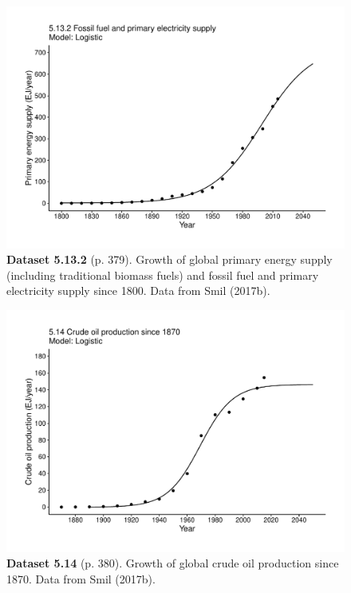 \documentclass[aps,rmp,preprint,superscriptaddress,10pt,onecolumn]{article}
\begin{document}
\clearpage
\begin{figure}[h]
\includegraphics[width=\textwidth]{output/figs-ggplot/5.13.2.pdf}
\caption*{\textbf{Dataset 5.13.2} (p. 379). Growth of global primary energy supply (including traditional biomass fuels) and fossil fuel and primary electricity supply since 1800. Data from Smil (2017b). }
\end{figure}
	
\clearpage
\begin{figure}[h]
\includegraphics[width=\textwidth]{output/figs-ggplot/5.14.pdf}
\caption*{\textbf{Dataset 5.14} (p. 380). Growth of global crude oil production since 1870. Data from Smil (2017b).}
\end{figure}
	
\end{document}
